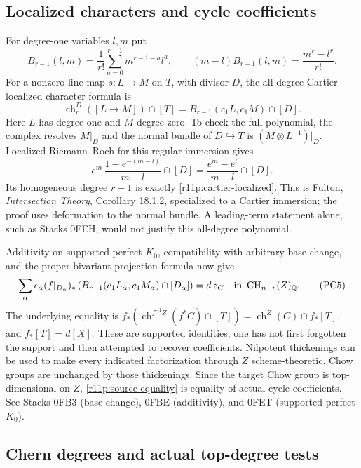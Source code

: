 \subsection{Localized characters and cycle coefficients}

For degree-one variables $l,m$ put
\[
 B_{r-1}(l,m)=\frac1{r!}\sum_{a=0}^{r-1}m^{r-1-a}l^a,
 \qquad
                  (m-l)B_{r-1}(l,m)=\frac{m^r-l^r}{r!}.
\tag{PC3}\label{r11p:B-polynomial}
\]
For a nonzero line map $s:L\to M$ on $T$, with divisor $D$, the
all-degree Cartier localized character formula is
\[
 \operatorname{ch}^{D}_r([L\to M])\cap[T]
         =B_{r-1}(c_1L,c_1M)\cap[D].
\tag{PC4}\label{r11p:cartier-localized}
\]
Here $L$ has degree one and $M$ degree zero.  To check the full
polynomial, the complex resolves $M|_D$ and the normal bundle of
$D\hookrightarrow T$ is $(M\otimes L^{-1})|_D$.  Localized
Riemann--Roch for this regular immersion gives
\[
 e^m\,\frac{1-e^{-(m-l)}}{m-l}\cap[D]
                         =\frac{e^m-e^l}{m-l}\cap[D].
\]
Its homogeneous degree $r-1$ is exactly \eqref{r11p:cartier-localized}.
This is Fulton, \emph{Intersection Theory}, Corollary 18.1.2,
specialized to a Cartier immersion; the proof uses deformation to the
normal bundle.  A leading-term statement alone, such as Stacks 0FEH,
would not justify this all-degree polynomial.

Additivity on supported perfect $K_0$, compatibility with arbitrary
base change, and the proper bivariant projection formula now give
\[
 \sum_\alpha\epsilon_\alpha
    (f|_{D_\alpha})_*
       \left(B_{r-1}(c_1L_\alpha,c_1M_\alpha)\cap[D_\alpha]\right)
                              =d\,z_C
       \quad\hbox{in }\operatorname{CH}_{n-r}(Z)_{\mathbb Q}.
\tag{PC5}\label{r11p:source-equality}
\]
The underlying equality is
$f_*(\operatorname{ch}^{f^{-1}Z}(f^*C)\cap[T])
=\operatorname{ch}^Z(C)\cap f_*[T]$, and $f_*[T]=d[X]$.
These are supported identities; one has not first forgotten the
support and then attempted to recover coefficients.  Nilpotent
thickenings can be used to make every indicated factorization through
$Z$ scheme-theoretic.  Chow groups are unchanged by those thickenings.
Since the target Chow group is top-dimensional on $Z$,
\eqref{r11p:source-equality} is equality of actual cycle coefficients.
See Stacks 0FB3 (base change), 0FBE (additivity), and 0FET (supported
perfect $K_0$).

\subsection{Chern degrees and actual top-degree tests}

